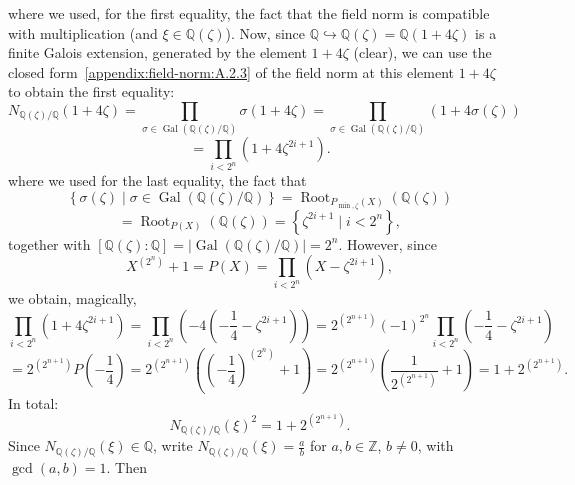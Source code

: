 \begin{solution}
\[    \]
    where we used, for the first equality, the fact that the field norm is compatible with multiplication (and \( \xi \in \mathbb{Q}\left(\zeta\right) \)). Now, since \( \mathbb{Q} \hookrightarrow \mathbb{Q}\left(\zeta\right) = \mathbb{Q}\left(1 + 4\zeta\right) \) is a finite Galois extension, generated by the element \( 1 + 4\zeta \) (clear), we can use the closed form~\eqref{appendix:field-norm:A.2.3} of the field norm at this element \( 1 + 4\zeta \) to obtain the first equality:
    \[
        N_{\mathbb{Q}\left(\zeta\right)/\mathbb{Q}}\left(1 + 4\zeta\right)=\prod_{\sigma \in \operatorname{Gal}\left(\mathbb{Q}\left(\zeta\right)/\mathbb{Q}\right)} \sigma\left(1 + 4\zeta\right) = \prod_{\sigma \in \operatorname{Gal}\left(\mathbb{Q}\left(\zeta\right)/\mathbb{Q}\right)} \left( 1 + 4\sigma\left(\zeta\right) \right)
    \]
    \[
        = \prod_{i< 2^n} \left( 1 + 4\zeta^{2i+1} \right).
    \]
    where we used for the last equality, the fact that
    \[
        \left\{\sigma\left(\zeta\right)\mid\sigma\in \operatorname{Gal}\left(\mathbb{Q}\left(\zeta\right)/\mathbb{Q}\right)\right\}=\operatorname{Root}_{P_{\min, \zeta}\left(X\right)}\left(\mathbb{Q}\left(\zeta\right) \right)
    \]
    \[
        = \operatorname{Root}_{P\left(X\right)}\left(\mathbb{Q}\left(\zeta\right) \right) = \left\{ \zeta^{2i+1} \mid i < 2^n \right\},
    \]
    together with \( \left[ \mathbb{Q}\left(\zeta\right) : \mathbb{Q} \right] = \left| \operatorname{Gal}\left(
    \mathbb{Q}\left(\zeta\right)/\mathbb{Q} \right) \right|=2^n \). However, since \[
        X^{\left(2^{n}\right)} + 1 = P\left(X\right) = \prod_{i < 2^n} \left( X - \zeta^{2i+1} \right),
    \]
    we obtain, magically,
    \[
        \prod_{i < 2^n} \left( 1 + 4\zeta^{2i+1} \right) = \prod_{i < 2^n} \left( -4\left( -\frac{1}{4} - \zeta^{2i+1} \right) \right) = 2^{\left(2^{n+1}\right)} \left(-1\right)^{2^n} \prod_{i < 2^n} \left( -\frac{1}{4} - \zeta^{2i+1} \right)
    \]
    \[
        = 2^{\left(2^{n+1}\right)} P\left( -\frac{1}{4} \right) = 2^{\left(2^{n+1}\right)} \left( \left( -\frac{1}{4} \right)^{\left(2^{n}\right)} + 1 \right) = 2^{\left(2^{n+1}\right)} \left( \frac{1}{2^{\left(2^{n+1}\right)}} + 1 \right) = 1 + 2^{\left(2^{n+1}\right)}.
    \]
    In total:
    \[
        N_{\mathbb{Q}\left(\zeta\right)/\mathbb{Q}}\left(\xi\right)^2 = 1 + 2^{\left(2^{n+1}\right)}.
    \]
    Since \( N_{\mathbb{Q}\left(\zeta\right)/\mathbb{Q}}\left(\xi\right) \in \mathbb{Q} \), write \( N_{\mathbb{Q}\left(\zeta\right)/\mathbb{Q}}\left(\xi\right) = \frac{a}{b} \) for \( a, b \in \mathbb{Z} \), \( b \neq 0 \), with \( \gcd\left(a, b\right) = 1 \). Then

\end{solution}
